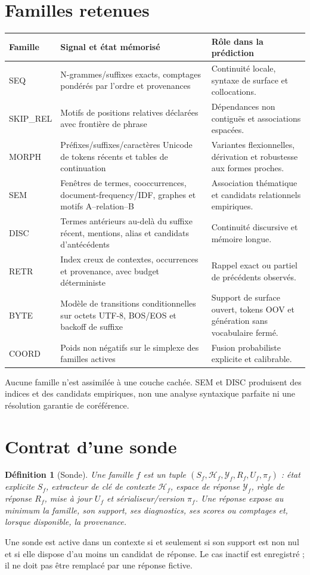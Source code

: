 \documentclass[11pt,a4paper,oneside,openany]{book}
\newtheorem{definition}{Définition}[chapter]
\begin{document}
\section{Familles retenues}
\begin{longtable}{p{}p{}p{}}
\toprule Famille & Signal et état mémorisé & Rôle dans la prédiction\\\midrule
SEQ & N-grammes/suffixes exacts, comptages pondérés par l'ordre et provenances & Continuité locale, syntaxe de surface et collocations.\\
SKIP\_REL & Motifs de positions relatives déclarées avec frontière de phrase & Dépendances non contiguës et associations espacées.\\
MORPH & Préfixes/suffixes/caractères Unicode de tokens récents et tables de continuation & Variantes flexionnelles, dérivation et robustesse aux formes proches.\\
SEM & Fenêtres de termes, cooccurrences, document-frequency/IDF, graphes et motifs A--relation--B & Association thématique et candidats relationnels empiriques.\\
DISC & Termes antérieurs au-delà du suffixe récent, mentions, alias et candidats d'antécédents & Continuité discursive et mémoire longue.\\
RETR & Index creux de contextes, occurrences et provenance, avec budget déterministe & Rappel exact ou partiel de précédents observés.\\
BYTE & Modèle de transitions conditionnelles sur octets UTF-8, BOS/EOS et backoff de suffixe & Support de surface ouvert, tokens OOV et génération sans vocabulaire fermé.\\
COORD & Poids non négatifs sur le simplexe des familles actives & Fusion probabiliste explicite et calibrable.\\
\bottomrule\end{longtable}
Aucune famille n'est assimilée à une couche cachée. SEM et DISC produisent des indices et des candidats empiriques, non une analyse syntaxique parfaite ni une résolution garantie de coréférence.

\section{Contrat d'une sonde}
\begin{definition}[Sonde]
Une famille $f$ est un tuple $(S_f,\mathcal H_f,\mathcal Y_f,R_f,U_f,\pi_f)$ : état explicite $S_f$, extracteur de clé de contexte $\mathcal H_f$, espace de réponse $\mathcal Y_f$, règle de réponse $R_f$, mise à jour $U_f$ et sérialiseur/version $\pi_f$. Une réponse expose au minimum la famille, son support, ses diagnostics, ses scores ou comptages et, lorsque disponible, la provenance.
\end{definition}
Une sonde est active dans un contexte si et seulement si son support est non nul et si elle dispose d'au moins un candidat de réponse. Le cas inactif est enregistré ; il ne doit pas être remplacé par une réponse fictive.
\end{document}
